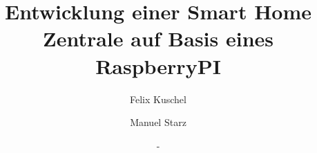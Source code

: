 \documentclass[12pt,a4paper]{article}
\author{Felix Kuschel
	\and Manuel Starz}
\title{Entwicklung einer Smart Home Zentrale auf Basis eines RaspberryPI}
\date{-}
\begin{document}
	
	\tableofcontents
	\newpage
	
 	
	
	
	
	
	
	
		
	
 	
 	\listoffigures
 	\lstlistoflistings
\end{document}
